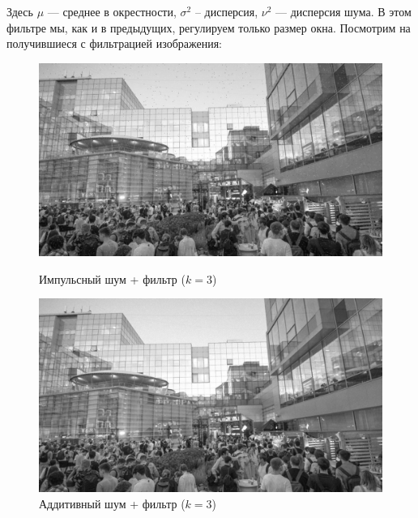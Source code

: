 \documentclass[a4paper]{article}
\begin{document}
Здесь $\mu$ --- среднее в окрестности, $\sigma^2$ -- дисперсия, $\nu^2$ --- дисперсия шума. В этом фильтре мы, как и в предыдущих, регулируем только размер окна. Посмотрим на получившиеся с фильтрацией изображения:
\begin{figure}[H]
    \begin{minipage}{0.49\textwidth}
        \centering \includegraphics[width=\textwidth]{images/3_nonlinear_filters/impulse - wiener (k=3).jpg}
        \caption{Импульсный шум + фильтр ($k = 3$)}
    \end{minipage}\hfill
    \begin{minipage}{0.49\textwidth}
        \centering \includegraphics[width=\textwidth]{images/3_nonlinear_filters/additive - wiener (k=3).jpg}
        \caption{Аддитивный шум + фильтр ($k = 3$)}
    \end{minipage}
\end{figure}
\end{document}
